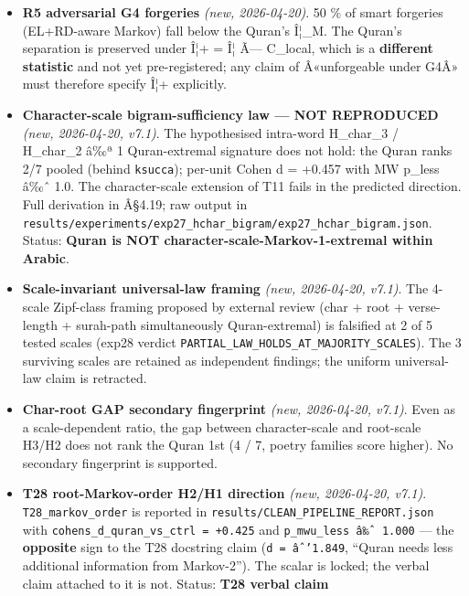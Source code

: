 \documentclass[
]{article}
\begin{document}
\begin{itemize}
  \textbf{R9 cross-scale VIS direction} \emph{(new, 2026-04-20)}.
  Pre-registered direction predicted Quran VIS \textgreater{} 1;
  observed VIS = 0.485 \textless{} 1 (reversed). Reported transparently;
  no relabelling.
\item
  \textbf{R5 adversarial G4 forgeries} \emph{(new, 2026-04-20)}. 50 \%
  of smart forgeries (EL+RD-aware Markov) fall below the Quran's Î¦\_M.
  The Quran's separation is preserved under Î¦+ = Î¦ Ã--- C\_local,
  which is a \textbf{different statistic} and not yet pre-registered;
  any claim of Â«unforgeable under G4Â» must therefore specify Î¦+
  explicitly.
\item
  \textbf{Character-scale bigram-sufficiency law --- NOT REPRODUCED}
  \emph{(new, 2026-04-20, v7.1)}. The hypothesised intra-word H\_char\_3
  / H\_char\_2 â‰ª 1 Quran-extremal signature does not hold: the Quran
  ranks 2/7 pooled (behind \texttt{ksucca}); per-unit Cohen d = +0.457
  with MW p\_less â‰ˆ 1.0. The character-scale extension of T11 fails in
  the predicted direction. Full derivation in Â§4.19; raw output in
  \texttt{results/experiments/exp27\_hchar\_bigram/exp27\_hchar\_bigram.json}.
  Status: \textbf{Quran is NOT character-scale-Markov-1-extremal within
  Arabic}.
\item
  \textbf{Scale-invariant universal-law framing} \emph{(new, 2026-04-20,
  v7.1)}. The 4-scale Zipf-class framing proposed by external review
  (char + root + verse-length + surah-path simultaneously
  Quran-extremal) is falsified at 2 of 5 tested scales (exp28 verdict
  \texttt{PARTIAL\_LAW\_HOLDS\_AT\_MAJORITY\_SCALES}). The 3 surviving
  scales are retained as independent findings; the uniform universal-law
  claim is retracted.
\item
  \textbf{Char-root GAP secondary fingerprint} \emph{(new, 2026-04-20,
  v7.1)}. Even as a scale-dependent ratio, the gap between
  character-scale and root-scale H3/H2 does not rank the Quran 1st (4 /
  7, poetry families score higher). No secondary fingerprint is
  supported.
\item
  \textbf{T28 root-Markov-order H2/H1 direction} \emph{(new, 2026-04-20,
  v7.1)}. \texttt{T28\_markov\_order} is reported in
  \texttt{results/CLEAN\_PIPELINE\_REPORT.json} with
  \texttt{cohens\_d\_quran\_vs\_ctrl\ =\ +0.425} and
  \texttt{p\_mwu\_less\ â‰ˆ\ 1.000} --- the \textbf{opposite} sign to
  the T28 docstring claim (\texttt{d\ =\ âˆ’1.849}, ``Quran needs less
  additional information from Markov-2''). The scalar is locked; the
  verbal claim attached to it is not. Status: \textbf{T28 verbal claim
}
\end{itemize}
\end{document}
